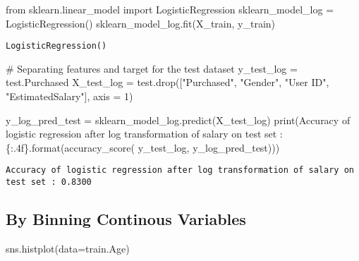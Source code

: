 \documentclass[
  letterpaper,
  DIV=11,
  numbers=noendperiod]{scrreprt}
\newenvironment{Shaded}{\begin{snugshade}}{\end{snugshade}}
\newcommand{\BuiltInTok}[1]{\textcolor[rgb]{0.00,0.23,0.31}{#1}}
\newcommand{\CommentTok}[1]{\textcolor[rgb]{0.37,0.37,0.37}{#1}}
\newcommand{\DecValTok}[1]{\textcolor[rgb]{0.68,0.00,0.00}{#1}}
\newcommand{\ImportTok}[1]{\textcolor[rgb]{0.00,0.46,0.62}{#1}}
\newcommand{\NormalTok}[1]{\textcolor[rgb]{0.00,0.23,0.31}{#1}}
\newcommand{\OperatorTok}[1]{\textcolor[rgb]{0.37,0.37,0.37}{#1}}
\newcommand{\SpecialCharTok}[1]{\textcolor[rgb]{0.37,0.37,0.37}{#1}}
\newcommand{\StringTok}[1]{\textcolor[rgb]{0.13,0.47,0.30}{#1}}
\begin{document}
\begin{Shaded}
\begin{Highlighting}[]
\ImportTok{from}\NormalTok{ sklearn.linear\_model }\ImportTok{import}\NormalTok{ LogisticRegression}
\NormalTok{sklearn\_model\_log }\OperatorTok{=}\NormalTok{ LogisticRegression()}
\NormalTok{sklearn\_model\_log.fit(X\_train, y\_train)}
\end{Highlighting}
\end{Shaded}

\begin{verbatim}
LogisticRegression()
\end{verbatim}

\begin{Shaded}
\begin{Highlighting}[]
\CommentTok{\# Separating features and target for the test dataset}
\NormalTok{y\_test\_log }\OperatorTok{=}\NormalTok{ test.Purchased}
\NormalTok{X\_test\_log }\OperatorTok{=}\NormalTok{ test.drop([}\StringTok{"Purchased"}\NormalTok{, }\StringTok{"Gender"}\NormalTok{, }\StringTok{"User ID"}\NormalTok{, }\StringTok{"EstimatedSalary"}\NormalTok{], axis }\OperatorTok{=} \DecValTok{1}\NormalTok{)}
\end{Highlighting}
\end{Shaded}

\begin{Shaded}
\begin{Highlighting}[]
\NormalTok{y\_log\_pred\_test }\OperatorTok{=}\NormalTok{ sklearn\_model\_log.predict(X\_test\_log)}
\BuiltInTok{print}\NormalTok{(}\StringTok{\textquotesingle{}Accuracy of logistic regression after log transformation of salary on test set : }\SpecialCharTok{\{:.4f\}}\StringTok{\textquotesingle{}}\NormalTok{.}\BuiltInTok{format}\NormalTok{(accuracy\_score( y\_test\_log, y\_log\_pred\_test)))}
\end{Highlighting}
\end{Shaded}

\begin{verbatim}
Accuracy of logistic regression after log transformation of salary on test set : 0.8300
\end{verbatim}

\subsection{By Binning Continous
Variables}\label{by-binning-continous-variables}

\begin{Shaded}
\begin{Highlighting}[]
\NormalTok{sns.histplot(data}\OperatorTok{=}\NormalTok{train.Age)}
\end{Highlighting}
\end{Shaded}
\end{document}
